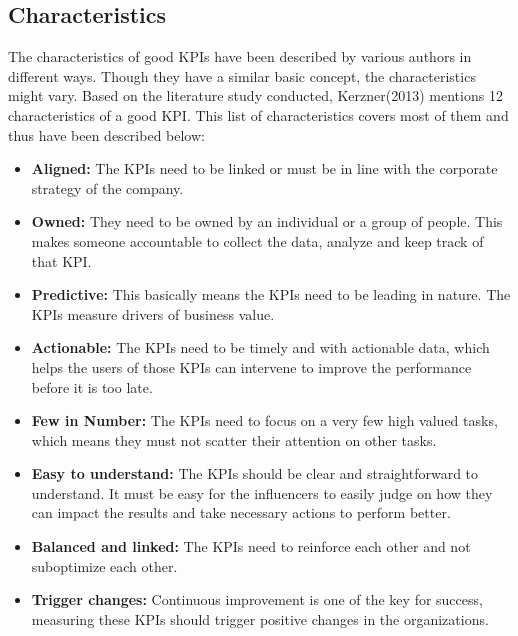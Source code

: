 \subsection{Characteristics}
 The characteristics of good KPIs have been described by various authors in different ways. Though they have a similar basic concept, the characteristics might vary. Based on the literature study conducted, Kerzner(2013) mentions 12 characteristics of a good KPI. This list of characteristics covers most of them and thus have been described  below:\\
 
 
 \begin{itemize}
     \item \textbf{Aligned:}
     The KPIs need to be linked or must be in line with the corporate strategy of the company.\\
     \item \textbf{Owned:}
     They need to be owned by an individual or a group of people. This makes someone accountable to collect the data, analyze and keep track of that KPI.\\
     \item \textbf{Predictive:}
     This basically means the KPIs need to be leading in nature. The KPIs measure drivers of business value.\\ 
     \item \textbf{Actionable:}
     The KPIs need to be timely and with actionable data, which helps the users of those KPIs can intervene to improve the performance before it is too late.\\ 
     \item \textbf{Few in Number:}
     The KPIs need to focus on a very few high valued tasks, which means they must not scatter their attention on other tasks. \\
     \item \textbf{Easy to understand:}
     The KPIs should be clear and straightforward to understand. It must be easy for the influencers to easily judge on how they can impact the results and take necessary actions to perform better.\\
     \item \textbf{Balanced and linked:}
     The KPIs need to reinforce each other and not suboptimize each other.\\
     \item \textbf{Trigger changes:}
     Continuous improvement is one of the key for success, measuring these KPIs should trigger positive changes in the organizations.\\ 

\end{itemize}
